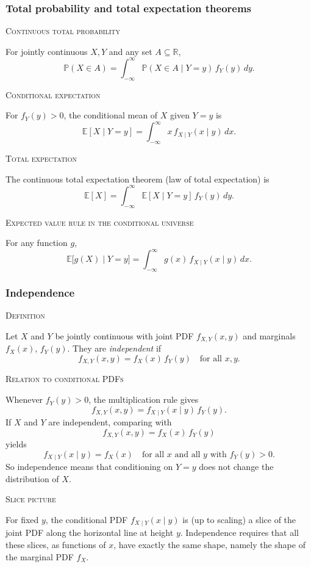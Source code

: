 \subsubsection{Total probability and total expectation theorems}

\textsc{Continuous total probability}

For jointly continuous \(X,Y\) and any set \(A \subseteq \mathbb{R}\),
\[
\mathbb{P}(X \in A)
=
\int_{-\infty}^{\infty}
\mathbb{P}(X \in A \mid Y = y)\,f_Y(y)\,dy.
\]

\textsc{Conditional expectation}

For \(f_Y(y)>0\), the conditional mean of \(X\) given \(Y=y\) is
\[
\mathbb{E}[X \mid Y = y]
=
\int_{-\infty}^{\infty} x\,f_{X\mid Y}(x\mid y)\,dx.
\]

\textsc{Total expectation}

The continuous total expectation theorem (law of total expectation) is
\[
\mathbb{E}[X]
=
\int_{-\infty}^{\infty}
\mathbb{E}[X \mid Y = y]\,f_Y(y)\,dy.
\]

\textsc{Expected value rule in the conditional universe}

For any function \(g\),
\[
\mathbb{E}\big[g(X) \mid Y = y\big]
=
\int_{-\infty}^{\infty} g(x)\,f_{X\mid Y}(x\mid y)\,dx.
\]


\subsubsection{Independence}

\textsc{Definition}

Let \(X\) and \(Y\) be jointly continuous with joint PDF \(f_{X,Y}(x,y)\) and marginals \(f_X(x)\), \(f_Y(y)\).  
They are \textit{independent} if
\[
f_{X,Y}(x,y) = f_X(x)\,f_Y(y)
\quad\text{for all }x,y.
\]

\textsc{Relation to conditional PDFs}

Whenever \(f_Y(y)>0\), the multiplication rule gives
\[
f_{X,Y}(x,y) = f_{X\mid Y}(x\mid y)\,f_Y(y).
\]
If \(X\) and \(Y\) are independent, comparing with
\[
f_{X,Y}(x,y) = f_X(x)\,f_Y(y)
\]
yields
\[
f_{X\mid Y}(x\mid y) = f_X(x)
\quad\text{for all }x\text{ and all }y\text{ with }f_Y(y)>0.
\]
So independence means that conditioning on \(Y=y\) does not change the distribution of \(X\).

\textsc{Slice picture}

For fixed \(y\), the conditional PDF \(f_{X\mid Y}(x\mid y)\) is (up to scaling) a slice of the joint PDF along the horizontal line at height \(y\).  
Independence requires that all these slices, as functions of \(x\), have exactly the same shape, namely the shape of the marginal PDF \(f_X\).

